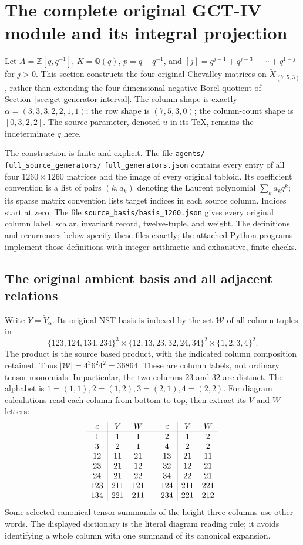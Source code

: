\section{The complete original GCT-IV module and its integral projection}
\label{sec:full-source-generators}

Let $A=\mathbb Z[q,q^{-1}]$, $K=\mathbb Q(q)$, $p=q+q^{-1}$,
and $[j]=q^{j-1}+q^{j-3}+\cdots+q^{1-j}$ for $j>0$.
This section constructs the four original Chevalley matrices on
$\check X_{(7,5,3)}$, rather than extending the four-dimensional
negative-Borel quotient of Section~\ref{sec:gct-generator-interval}.
The column shape is exactly $\alpha=(3,3,3,2,2,1,1)$; the row
shape is $(7,5,3,0)$; the column-count shape is $[0,3,2,2]$.
The source parameter, denoted $u$ in its TeX, remains the
indeterminate $q$ here.

The construction is finite and explicit.  The file
\texttt{agents/}\allowbreak
\texttt{full\_source\_generators/}\allowbreak
\texttt{full\_generators.json}
contains every entry of all four $1260\times1260$ matrices and
the image of every original tabloid. Its coefficient convention is
a list of pairs $(k,a_k)$ denoting the Laurent polynomial
$\sum_k a_kq^k$; its sparse matrix convention lists target indices
in each source column. Indices start at zero. The file
\texttt{source\_basis/basis\_1260.json} gives every original
column label, scalar, invariant record, twelve-tuple, and weight.
The definitions and recurrences below specify these files exactly;
the attached Python programs implement those definitions with
integer arithmetic and exhaustive, finite checks.

\subsection{The original ambient basis and all adjacent relations}

Write $Y=\check Y_\alpha$. Its original NST basis is indexed by
the set $\mathcal W$ of all column tuples in
\[
 \{123,124,134,234\}^3\times
 \{12,13,23,32,24,34\}^2\times\{1,2,3,4\}^2.
\]
The product is the source based product, with the indicated column
composition retained. Thus $|\mathcal W|=4^3 6^2 4^2=36864$.
These are column labels, not ordinary tensor monomials. In
particular, the two columns $23$ and $32$ are distinct.
The alphabet is $1=(1,1),2=(1,2),3=(2,1),4=(2,2)$.
For diagram calculations read each column from bottom to top,
then extract its $V$ and $W$ letters:
\[
\begin{array}{c|cc@{\qquad}c|cc}
c&V&W&c&V&W\\\hline
1&1&1&2&1&2\\3&2&1&4&2&2\\
12&11&21&13&21&11\\23&21&12&32&12&21\\
24&21&22&34&22&21\\
123&211&121&124&211&221\\
134&221&211&234&221&212
\end{array}
\]
Some selected canonical tensor summands of the height-three
columns use other words. The displayed dictionary is the literal
diagram reading rule; it avoids identifying a whole column with
one summand of its canonical expansion.

